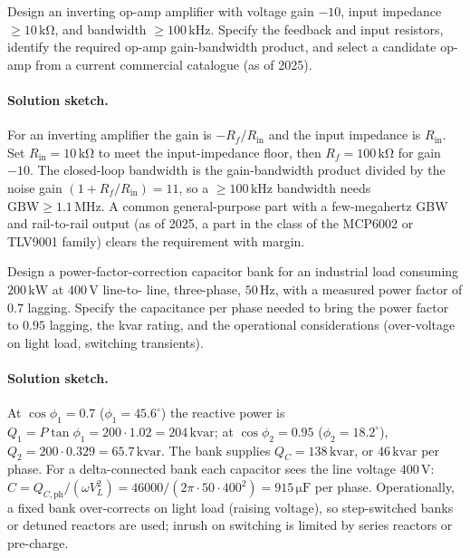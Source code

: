 \begin{exercise}
Design an inverting op-amp amplifier with voltage gain $-10$, input
impedance $\ge 10\,\si{\kilo\ohm}$, and bandwidth $\ge 100\,\si{\kilo
\hertz}$. Specify the feedback and input resistors, identify the
required op-amp gain-bandwidth product, and select a candidate op-amp
from a current commercial catalogue (as of 2025).
\paragraph{Solution sketch.}
For an inverting amplifier the gain is $-R_{f}/R_{\text{in}}$ and the
input impedance is $R_{\text{in}}$. Set $R_{\text{in}} = 10\,\si{\kilo
\ohm}$ to meet the input-impedance floor, then $R_{f} = 100\,\si{\kilo
\ohm}$ for gain $-10$. The closed-loop bandwidth is the gain-bandwidth
product divided by the noise gain $(1+R_{f}/R_{\text{in}}) = 11$, so a
$\ge 100\,\si{\kilo\hertz}$ bandwidth needs $\text{GBW}\ge 1.1\,\si{
\mega\hertz}$. A common general-purpose part with a few-megahertz GBW
and rail-to-rail output (as of 2025, a part in the class of the
MCP6002 or TLV9001 family) clears the requirement with margin.
\end{exercise}

\begin{exercise}
Design a power-factor-correction capacitor bank for an industrial
load consuming $200\,\si{\kilo\watt}$ at $400\,\si{\volt}$ line-to-
line, three-phase, $50\,\si{\hertz}$, with a measured power factor
of $0.7$ lagging. Specify the capacitance per phase needed to bring
the power factor to $0.95$ lagging, the kvar rating, and the
operational considerations (over-voltage on light load, switching
transients).
\paragraph{Solution sketch.}
At $\cos\phi_{1} = 0.7$ ($\phi_{1} = 45.6^\circ$) the reactive power is
$Q_{1} = P\tan\phi_{1} = 200\cdot 1.02 = 204\,\text{kvar}$; at
$\cos\phi_{2} = 0.95$ ($\phi_{2} = 18.2^\circ$), $Q_{2} = 200\cdot
0.329 = 65.7\,\text{kvar}$. The bank supplies $Q_{C} = 138\,\text{kvar}$,
or $46\,\text{kvar}$ per phase. For a delta-connected bank each
capacitor sees the line voltage $400\,\si{\volt}$: $C = Q_{C,\text{ph}}
/(\omega V_{L}^{2}) = 46000/(2\pi\cdot 50\cdot 400^{2}) = 915\,\si{
\micro\farad}$ per phase. Operationally, a fixed bank over-corrects on
light load (raising voltage), so step-switched banks or detuned
reactors are used; inrush on switching is limited by series reactors or
pre-charge.
\end{exercise}

